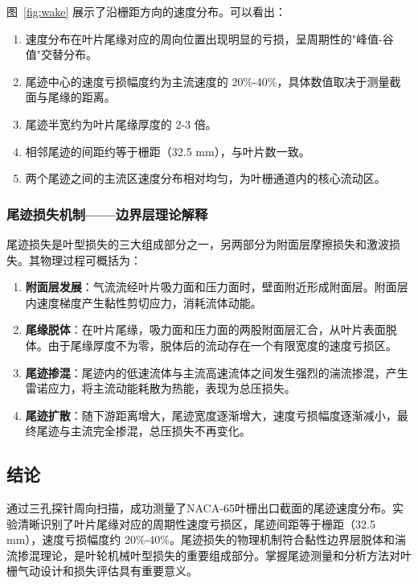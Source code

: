 图~\ref{fig:wake} 展示了沿栅距方向的速度分布。可以看出：
\begin{enumerate}
    \item 速度分布在叶片尾缘对应的周向位置出现明显的亏损，呈周期性的"峰值-谷值"交替分布。
    \item 尾迹中心的速度亏损幅度约为主流速度的 20\%-40\%，具体数值取决于测量截面与尾缘的距离。
    \item 尾迹半宽约为叶片尾缘厚度的 2-3 倍。
    \item 相邻尾迹的间距约等于栅距（32.5 mm），与叶片数一致。
    \item 两个尾迹之间的主流区速度分布相对均匀，为叶栅通道内的核心流动区。
\end{enumerate}

\subsubsection{尾迹损失机制——边界层理论解释}

尾迹损失是叶型损失的三大组成部分之一，另两部分为附面层摩擦损失和激波损失。其物理过程可概括为：

\begin{enumerate}
    \item \textbf{附面层发展}：气流流经叶片吸力面和压力面时，壁面附近形成附面层。附面层内速度梯度产生黏性剪切应力，消耗流体动能。
    \item \textbf{尾缘脱体}：在叶片尾缘，吸力面和压力面的两股附面层汇合，从叶片表面脱体。由于尾缘厚度不为零，脱体后的流动存在一个有限宽度的速度亏损区。
    \item \textbf{尾迹掺混}：尾迹内的低速流体与主流高速流体之间发生强烈的湍流掺混，产生雷诺应力，将主流动能耗散为热能，表现为总压损失。
    \item \textbf{尾迹扩散}：随下游距离增大，尾迹宽度逐渐增大，速度亏损幅度逐渐减小，最终尾迹与主流完全掺混，总压损失不再变化。
\end{enumerate}

\subsection{结论}

通过三孔探针周向扫描，成功测量了NACA-65叶栅出口截面的尾迹速度分布。实验清晰识别了叶片尾缘对应的周期性速度亏损区，尾迹间距等于栅距（32.5 mm），速度亏损幅度约 20\%-40\%。尾迹损失的物理机制符合黏性边界层脱体和湍流掺混理论，是叶轮机械叶型损失的重要组成部分。掌握尾迹测量和分析方法对叶栅气动设计和损失评估具有重要意义。
